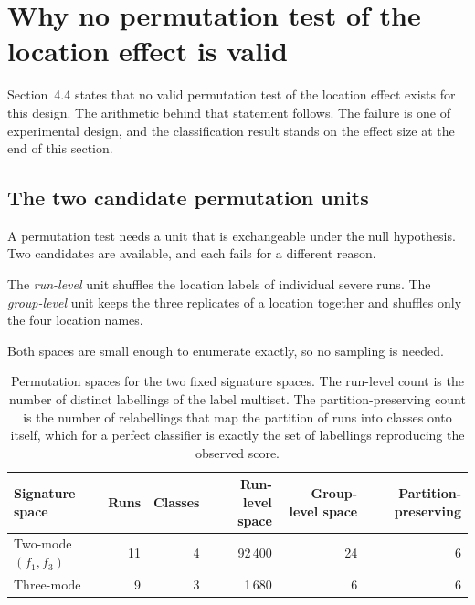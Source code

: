 %
%

\section{Why no permutation test of the location effect is valid}
\label{app:perm}

Section~4.4 states that no valid permutation test of the location effect exists
for this design. The arithmetic behind that statement follows. The failure is one of experimental
design, and the classification result stands on the effect size at the end of
this section.

\subsection*{The two candidate permutation units}

A permutation test needs a unit that is exchangeable under the null hypothesis.
Two candidates are available, and each fails for a different reason.

The \emph{run-level} unit shuffles the location labels of individual severe runs.
The \emph{group-level} unit keeps the three replicates of a location together and
shuffles only the four location names.

Both spaces are small enough to enumerate exactly, so no sampling is needed.

\begin{table}[htbp]
\centering
\caption{Permutation spaces for the two fixed signature spaces. The run-level
count is the number of distinct labellings of the label multiset. The
partition-preserving count is the number of relabellings that map the partition
of runs into classes onto itself, which for a perfect classifier is exactly the
set of labellings reproducing the observed score.}
\label{tab:perm-spaces}
\begin{tabular}{lrrrrr}
\toprule
Signature space & Runs & Classes & Run-level space & Group-level space & Partition-preserving \\
\midrule
Two-mode $(f_1,f_3)$   & 11 & 4 & 92\,400 & 24 & 6 \\
Three-mode             &  9 & 3 &  1\,680 &  6 & 6 \\
\bottomrule
\end{tabular}
\end{table}

